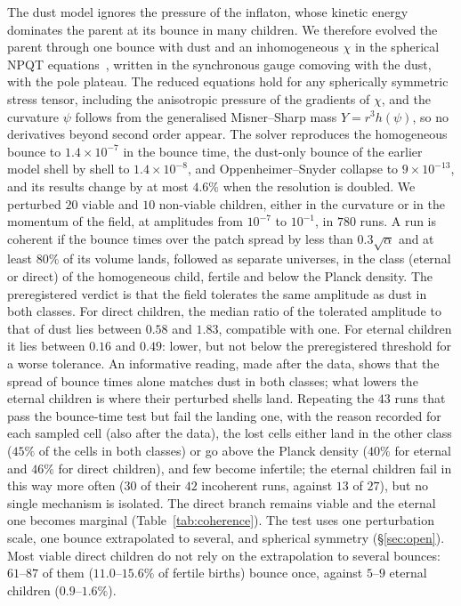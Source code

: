 \documentclass[11pt,a4paper]{article}
\begin{document}
The dust model ignores the pressure of the inflaton, whose kinetic energy dominates the parent at its bounce in many children.
We therefore evolved the parent through one bounce with dust and an inhomogeneous $\chi$ in the spherical NPQT equations~\cite{Bueno2025formation}, written in the synchronous gauge comoving with the dust, with the pole plateau. The reduced equations hold for any spherically symmetric stress tensor, including the anisotropic pressure of the gradients of $\chi$, and the curvature $\psi$ follows from the generalised Misner--Sharp mass $Y=r^3h(\psi)$, so no derivatives beyond second order appear.
The solver reproduces the homogeneous bounce to $1.4\times10^{-7}$ in the bounce time, the dust-only bounce of the earlier model shell by shell to $1.4\times10^{-8}$, and Oppenheimer--Snyder collapse to $9\times10^{-13}$, and its results change by at most $4.6\%$ when the resolution is doubled.
We perturbed $20$ viable and $10$ non-viable children, either in the curvature or in the momentum of the field, at amplitudes from $10^{-7}$ to $10^{-1}$, in $780$ runs.
A run is coherent if the bounce times over the patch spread by less than $0.3\sqrt{\alpha}$ and at least $80\%$ of its volume lands, followed as separate universes, in the class (eternal or direct) of the homogeneous child, fertile and below the Planck density.
The preregistered verdict is that the field tolerates the same amplitude as dust in both classes.
For direct children, the median ratio of the tolerated amplitude to that of dust lies between $0.58$ and $1.83$, compatible with one.
For eternal children it lies between $0.16$ and $0.49$: lower, but not below the preregistered threshold for a worse tolerance.
An informative reading, made after the data, shows that the spread of bounce times alone matches dust in both classes; what lowers the eternal children is where their perturbed shells land. Repeating the $43$ runs that pass the bounce-time test but fail the landing one, with the reason recorded for each sampled cell (also after the data), the lost cells either land in the other class ($45\%$ of the cells in both classes) or go above the Planck density ($40\%$ for eternal and $46\%$ for direct children), and few become infertile; the eternal children fail in this way more often ($30$ of their $42$ incoherent runs, against $13$ of $27$), but no single mechanism is isolated.
The direct branch remains viable and the eternal one becomes marginal (Table~\ref{tab:coherence}).
The test uses one perturbation scale, one bounce extrapolated to several, and spherical symmetry (\S\ref{sec:open}).
Most viable direct children do not rely on the extrapolation to several bounces: $61$--$87$ of them ($11.0$--$15.6\%$ of fertile births) bounce once, against $5$--$9$ eternal children ($0.9$--$1.6\%$).
\end{document}
